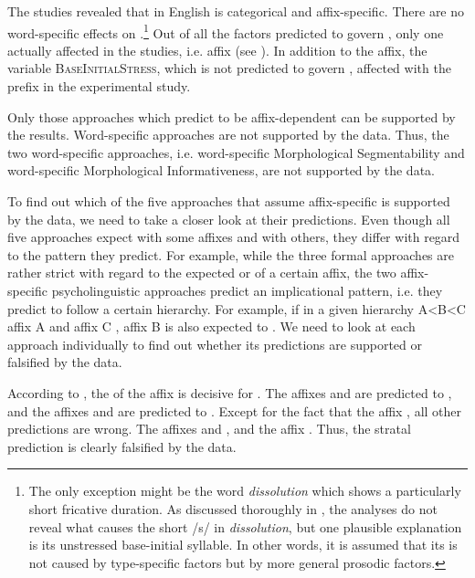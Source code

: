The studies revealed that  in English is categorical and affix-specific. There are no word-specific effects on .\footnote{The only exception might be the word \textit{dissolution} which shows a particularly short fricative duration. As discussed thoroughly in , the analyses do not reveal what causes the short /s/ in \textit{dissolution}, but one plausible explanation is its unstressed base-initial syllable. In other words, it is assumed that its  is not caused by type-specific factors but by more general prosodic factors.} Out of all the factors predicted to govern , only one actually affected  in the studies, i.e. affix (see ). 
In addition to the affix, the variable \textsc{BaseInitialStress}, which is not predicted to govern ,  affected  with the prefix  in the experimental study. 

Only those approaches which predict  to be affix-dependent can be supported by the results. Word-specific approaches are not supported by the data.
Thus, the two word-specific approaches, i.e. word-specific Morphological Segmentability and word-specific Morphological Informativeness, are  not supported by the data. 

To find out which of the five approaches that assume affix-specific  is supported by the data, we need to take a closer look at their predictions. Even though all five approaches expect   with some affixes and  with others, they differ with regard to the  pattern they predict. For example, while the three formal approaches are rather strict with regard to the expected  or  of a  certain affix, the two affix-specific psycholinguistic approaches predict an implicational  pattern, i.e. they predict  to follow a certain hierarchy. For example, if in a given hierarchy A<B<C  affix A and affix C , affix B is also expected to . 
We need to look at each approach individually to find out whether its predictions are supported or falsified by the data. 

According to , the  of the affix is decisive for . The  affixes  and  are predicted to , and the  affixes  and  are predicted to . Except for the fact that the  affix  , all other predictions are wrong. The  affixes  and  , and the  affix  . Thus, the stratal prediction is clearly falsified by the data.


